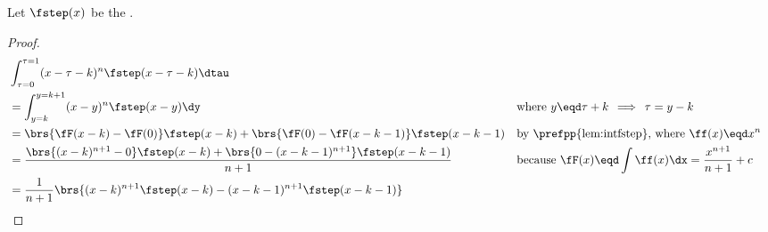 \begin{lemma}
\label{lem:intfstepk}
Let $\fstep(x)$ be the  .
\end{lemma}
\begin{proof}
\begin{align*}
  &\int_{\tau=0}^{\tau=1} (x-\tau-k)^n \fstep(x-\tau-k)\dtau
  \\&= \int_{y=k}^{y=k+1} (x-y)^n \fstep(x-y)\dy
    && \text{where $y\eqd\tau+k\,\implies\,\tau=y-k$}
  \\&= \brs{\fF(x-k)-\fF(0)}\fstep(x-k) + \brs{\fF(0)-\fF(x-k-1)}\fstep(x-k-1)
    && \text{by \prefpp{lem:intfstep}, where $\ff(x)\eqd x^n$}
  \\&= \frac{\brs{(x-k)^{n+1}-0}\fstep(x-k) + \brs{0-(x-k-1)^{n+1}}\fstep(x-k-1)}{n+1}
    && \text{because $\fF(x)\eqd\int\ff(x)\dx=\frac{x^{n+1}}{n+1}+c$}
  \\&= \frac{1}{n+1}\brs{(x-k)^{n+1}\fstep(x-k) - (x-k-1)^{n+1}\fstep(x-k-1)}
\end{align*}
\end{proof}

